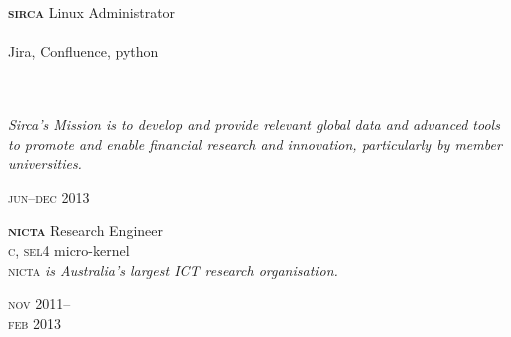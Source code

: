 \begin{minipage}[t]{0.7\textwidth}
\textbf{\textsc{sirca}}\phantom{..} Linux Administrator \\
\\
Jira, Confluence, python
\\
\\
\\
{\small
\textit{Sirca’s Mission is to develop and provide relevant global data and advanced tools to promote and enable financial research and innovation, particularly by member universities.}
\par}
\end{minipage}
\begin{minipage}[t]{0.3\textwidth}
\hfill \textsc{jun}--\textsc{dec} 2013\\
\end{minipage}

\vspace{0.2in}

\begin{minipage}[t]{0.75\textwidth}
\textbf{\textsc{nicta}}\phantom{..} Research Engineer \\
\textsc{c}, \textsc{sel4} micro-kernel \\
{\small
\textsc{nicta}\textit{ is Australia's largest ICT research organisation.}
}
\end{minipage}
\begin{minipage}[t]{0.25\textwidth}
{
\hfill \textsc{nov} 2011--\\ 
\hspace*{0pt} \hfill \textsc{feb} 2013
\par
}
\end{minipage}







